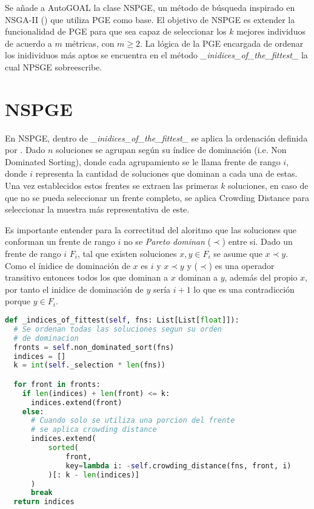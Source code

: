 Se a\~nade a AutoGOAL la clase NSPGE, un m\'etodo de b\'usqueda inspirado en NSGA-II (\cite{deb2002fast}) que utiliza PGE como base. El objetivo de NSPGE es extender la funcionalidad de PGE para que sea capaz de seleccionar los $k$ mejores individuos de acuerdo a $m$ m\'etricas, con $m \ge 2$. La l\'ogica de la PGE encargada de ordenar los inidividuos m\'as aptos se encuentra en el m\'etodo \textit{\_inidices\_of\_the\_fittest\_} la cual NPSGE sobreescribe.

\section{NSPGE}

En NSPGE, dentro de \textit{\_inidices\_of\_the\_fittest\_} se aplica la ordenaci\'on definida por \cite{deb2002fast}. Dado $n$ soluciones se  agrupan seg\'un su \'indice de dominaci\'on (i.e. Non Dominated Sorting), donde cada agrupamiento se le llama frente de rango $i$, donde $i$ representa la cantidad de soluciones que dominan a cada una de estas. Una vez establecidos estos frentes se extraen las primeras $k$ soluciones, en caso de que no se pueda seleccionar un frente completo, se aplica Crowding Distance para seleccionar la muestra m\'as representativa de este.

Es importante entender para la correctitud del aloritmo  que las soluciones que conforman un frente de rango $i$ no se \textit{Pareto dominan} ($\prec$) entre si.
Dado un frente de rango $i$ $F_i$, tal que existen soluciones $x, y \in F_i$ se asume que $x \prec y$. Como el \'inidice de dominaci\'on de $x$ es $i$ y $x \prec y$ y ($\prec$) es una operador transitivo entonces todos los que dominan a $x$ dominan a $y$, adem\'as del propio $x$, por tanto el inidice de dominaci\'on de $y$ ser\'ia $i+1$ lo que es una contradicci\'on porque $y \in F_i$. 

\begin{lstlisting}[language=Python]
def _indices_of_fittest(self, fns: List[List[float]]):
  # Se ordenan todas las soluciones segun su orden
  # de dominacion
  fronts = self.non_dominated_sort(fns)
  indices = []
  k = int(self._selection * len(fns))

  for front in fronts:
    if len(indices) + len(front) <= k:
      indices.extend(front)
    else:
      # Cuando solo se utiliza una porcion del frente
      # se aplica crowding distance
      indices.extend(
          sorted(
              front,
              key=lambda i: -self.crowding_distance(fns, front, i)
          )[: k - len(indices)]
      )
      break
  return indices
\end{lstlisting}


